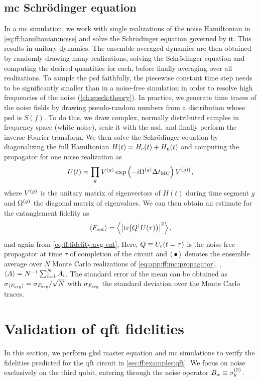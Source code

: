 \subsection{\texorpdfstring{\acrshort{mc}}{MC} Schrödinger equation}\label{subsec:app:ff:time_domain_methods:mc}
In a \gls{mc} simulation, we work with single realizations of the noise Hamiltonian in \cref{eq:ff:hamiltonian:noise} and solve the Schrödinger equation governed by it.
This results in unitary dynamics.
The ensemble-averaged dynamics are then obtained by randomly drawing many realizations, solving the Schrödinger equation and computing the desired quantities for each, before finally averaging over all realizations.
To sample the \gls{psd} faithfully, the piecewise constant time step needs to be significantly smaller than in a noise-free simulation in order to resolve high frequencies of the noise (\cf \cref{ch:speck:theory}).
In practice, we generate time traces of the noise fields by drawing pseudo-random numbers from a distribution whose \gls{psd} is $S(f)$.
To do this, we draw complex, normally distributed samples in frequency space (\ie white noise), scale it with the \gls{asd}, and finally perform the inverse Fourier transform.
We then solve the Schrödinger equation by diagonalizing the full Hamiltonian $H(t) = H_{\mathrm{c}}(t) + H_{\mathrm{n}}(t)$ and computing the propagator for one noise realization as
\begin{equation}\label{eq:app:ff:mc:propagator}
    U(t) = \prod_g V^{(g)}\exp\left(-i\Omega^{(g)}\Delta t_{\mathrm{MC}}\right) V^{(g)\dagger},
\end{equation}
where $V^{(g)}$ is the unitary matrix of eigenvectors of $H(t)$ during time segment $g$ and $\Omega^{(g)}$ the diagonal matrix of eigenvalues.
We can then obtain an estimate for the entanglement fidelity \entfid as
\begin{equation}
    \ev{\entfid} = \ev{\abs{\tr(Q\adjoint U(\tau))}^2},
\end{equation}
and \avgfid again from \cref{eq:ff:fidelity:avg-ent}.
Here, $Q\equiv U_{\mathrm{c}}(t=\tau)$ is the noise-free propagator at time $\tau$ of completion of the circuit and $\ev{\placeholder}$ denotes the ensemble average over $N$ Monte Carlo realizations of \cref{eq:app:ff:mc:propagator}, \ie, $\ev{A}=N\inverse\sum_{i=1}^N A_i$.
The standard error of the mean can be obtained as $\sigma_{\ev{\avgfid}} = \sigma_{\avgfid} / \sqrt{N}$ with $\sigma_{F_{\mathrm{avg}}}$ the standard deviation over the Monte Carlo traces.

\section{Validation of \texorpdfstring{\acrshort{qft}}{QFT} fidelities}\label{sec:app:ff:time_domain_methods:qft_validation}
In this section, we perform \gls{gksl} master equation and \gls{mc} simulations to verify the fidelities predicted for the \gls{qft} circuit in \cref{sec:ff:examples:qft}.
We focus on noise exclusively on the third qubit, entering through the noise operator $B_\alpha\equiv\sigma_y^{(3)}$.

